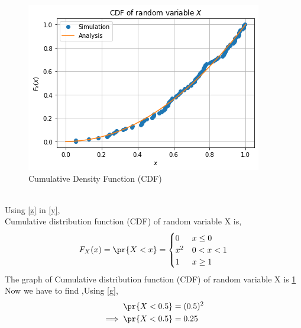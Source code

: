 \begin{figure}[ht]
    \centering
    \includegraphics[width=\columnwidth]{solutions/ec/15/figures/assign2_1.png}
    \caption{Cumulative Density Function (CDF)}
    \label{Figure_3}
\end{figure}
\\Using \eqref{z} in \eqref{y},
\\Cumulative distribution function (CDF) of random variable X is,
\begin{align}
F_X(x)= \pr{X<x}
= 
\begin{cases}
0 & x\leq0\\
x^2 & 0<x<1
\\
1 & x\geq1\label{g}\\
\end{cases}
\end{align}
The graph of Cumulative distribution function (CDF) of random variable X is \ref{Figure_3}\\
Now we have to find ,Using  \eqref{g},
\begin{align}
    \pr{X<0.5} &= (0.5)^2\\
  \implies \pr{X<0.5} &= 0.25
\end{align}

